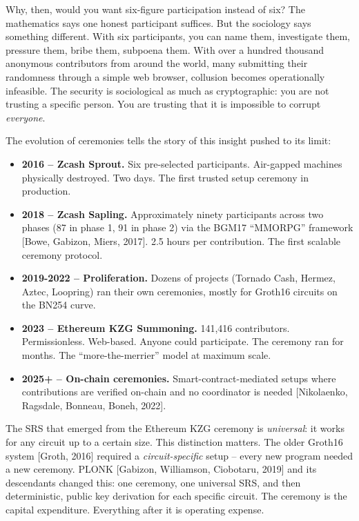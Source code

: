 \documentclass[
  11pt,
  openany]{report}
\providecommand{\tightlist}{%
  \setlength{\itemsep}{0pt}\setlength{\parskip}{0pt}}
\renewcommand{\textbf}[1]{{\bfseries\color{MidnightBold}#1}}
\begin{document}
Why, then, would you want six-figure participation instead of six? The
mathematics says one honest participant suffices. But the sociology says
something different. With six participants, you can name them, investigate them,
pressure them, bribe them, subpoena them. With over a hundred thousand anonymous
contributors from around the world, many submitting their randomness through a
simple web browser, collusion becomes operationally infeasible. The security is
sociological as much as cryptographic: you are not trusting a specific person.
You are trusting that it is impossible to corrupt \emph{everyone}.

The evolution of ceremonies tells the story of this insight pushed to its limit:

\begin{itemize}
\tightlist
\item
  \textbf{2016 -- Zcash Sprout.} Six pre-selected participants. Air-gapped
  machines physically destroyed. Two days. The first trusted setup ceremony in
  production.
\item
  \textbf{2018 -- Zcash Sapling.} Approximately ninety participants across two
  phases (87 in phase 1, 91 in phase 2) via the BGM17 ``MMORPG'' framework
  {[}Bowe, Gabizon, Miers, 2017{]}. 2.5 hours per contribution. The first
  scalable ceremony protocol.
\item
  \textbf{2019-2022 -- Proliferation.} Dozens of projects (Tornado Cash, Hermez,
  Aztec, Loopring) ran their own ceremonies, mostly for Groth16 circuits on the
  BN254 curve.
\item
  \textbf{2023 -- Ethereum KZG Summoning.} 141,416 contributors. Permissionless.
  Web-based. Anyone could participate. The ceremony ran for months. The
  ``more-the-merrier'' model at maximum scale.
\item
  \textbf{2025+ -- On-chain ceremonies.} Smart-contract-mediated setups where
  contributions are verified on-chain and no coordinator is needed
  {[}Nikolaenko, Ragsdale, Bonneau, Boneh, 2022{]}.
\end{itemize}

The SRS that emerged from the Ethereum KZG ceremony is \emph{universal}: it
works for any circuit up to a certain size. This distinction matters. The older
Groth16 system {[}Groth, 2016{]} required a \emph{circuit-specific} setup --
every new program needed a new ceremony. PLONK {[}Gabizon, Williamson,
Ciobotaru, 2019{]} and its descendants changed this: one ceremony, one universal
SRS, and then deterministic, public key derivation for each specific circuit.
The ceremony is the capital expenditure. Everything after it is operating
expense.
\end{document}

